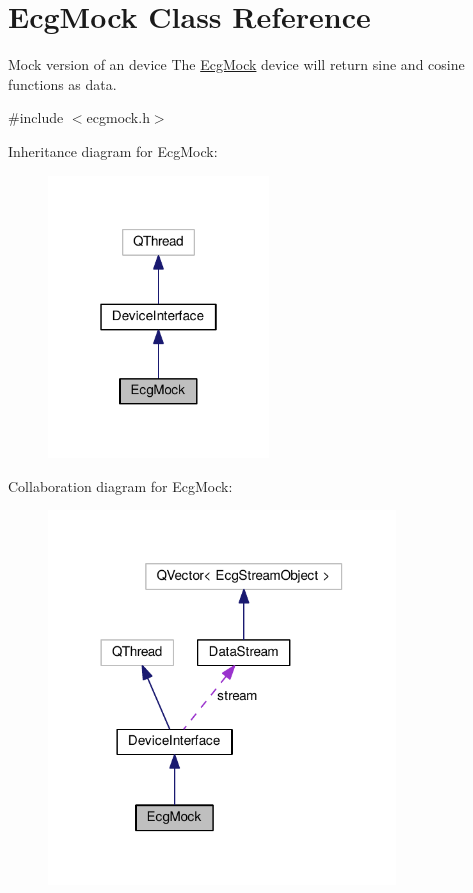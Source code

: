 \hypertarget{classEcgMock}{}\section{Ecg\+Mock Class Reference}
\label{classEcgMock}


Mock version of an device The \hyperlink{classEcgMock}{Ecg\+Mock} device will return sine and cosine functions as data.  




{\ttfamily \#include $<$ecgmock.\+h$>$}



Inheritance diagram for Ecg\+Mock\+:
\nopagebreak
\begin{figure}[H]
\begin{center}
\leavevmode
\includegraphics[width=166pt]{classEcgMock__inherit__graph}
\end{center}
\end{figure}


Collaboration diagram for Ecg\+Mock\+:
\nopagebreak
\begin{figure}[H]
\begin{center}
\leavevmode
\includegraphics[width=261pt]{classEcgMock__coll__graph}
\end{center}
\end{figure}
